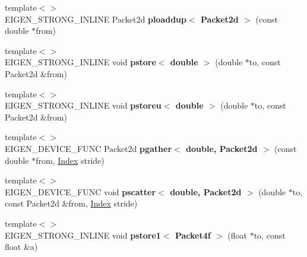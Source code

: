 \begin{DoxyCompactItemize}
\item 
\mbox{\label{namespace_eigen_1_1internal_a422d191db7a3b5d19a59688e9138dc1c}} 
{\footnotesize template$<$$>$ }\\E\+I\+G\+E\+N\+\_\+\+S\+T\+R\+O\+N\+G\+\_\+\+I\+N\+L\+I\+NE Packet2d {\bfseries ploaddup$<$ Packet2d $>$} (const double $\ast$from)
\item 
\mbox{\label{namespace_eigen_1_1internal_a816c2c3a7c2e85df5e58fe5a794a1fc8}} 
{\footnotesize template$<$$>$ }\\E\+I\+G\+E\+N\+\_\+\+S\+T\+R\+O\+N\+G\+\_\+\+I\+N\+L\+I\+NE void {\bfseries pstore$<$ double $>$} (double $\ast$to, const Packet2d \&from)
\item 
\mbox{\label{namespace_eigen_1_1internal_a3dfd013874cfa953711717da3b5b03c1}} 
{\footnotesize template$<$$>$ }\\E\+I\+G\+E\+N\+\_\+\+S\+T\+R\+O\+N\+G\+\_\+\+I\+N\+L\+I\+NE void {\bfseries pstoreu$<$ double $>$} (double $\ast$to, const Packet2d \&from)
\item 
\mbox{\label{namespace_eigen_1_1internal_ad5638aebcd54734e0ff846c96cf56224}} 
{\footnotesize template$<$$>$ }\\E\+I\+G\+E\+N\+\_\+\+D\+E\+V\+I\+C\+E\+\_\+\+F\+U\+NC Packet2d {\bfseries pgather$<$ double, Packet2d $>$} (const double $\ast$from, \hyperlink{namespace_eigen_a62e77e0933482dafde8fe197d9a2cfde}{Index} stride)
\item 
\mbox{\label{namespace_eigen_1_1internal_a89d81798ac59258f60784b5900b350cf}} 
{\footnotesize template$<$$>$ }\\E\+I\+G\+E\+N\+\_\+\+D\+E\+V\+I\+C\+E\+\_\+\+F\+U\+NC void {\bfseries pscatter$<$ double, Packet2d $>$} (double $\ast$to, const Packet2d \&from, \hyperlink{namespace_eigen_a62e77e0933482dafde8fe197d9a2cfde}{Index} stride)
\item 
\mbox{\label{namespace_eigen_1_1internal_a58cd7124b4d40f27f0bc96550256984c}} 
{\footnotesize template$<$$>$ }\\E\+I\+G\+E\+N\+\_\+\+S\+T\+R\+O\+N\+G\+\_\+\+I\+N\+L\+I\+NE void {\bfseries pstore1$<$ Packet4f $>$} (float $\ast$to, const float \&a)

\end{DoxyCompactItemize}
